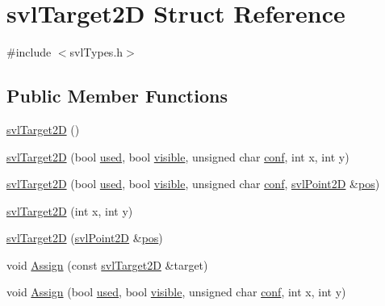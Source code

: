\hypertarget{structsvl_target2_d}{}\section{svl\+Target2\+D Struct Reference}
\label{structsvl_target2_d}


{\ttfamily \#include $<$svl\+Types.\+h$>$}

\subsection*{Public Member Functions}
\begin{DoxyCompactItemize}
\item 
\hyperlink{structsvl_target2_d_ae8f0d611fa66af1f6a157fec39503855}{svl\+Target2\+D} ()
\item 
\hyperlink{structsvl_target2_d_adcf9742ca9daddef7bb7ae43b7adf40c}{svl\+Target2\+D} (bool \hyperlink{structsvl_target2_d_a74896ef54f0cdc80faaee2a7321635bc}{used}, bool \hyperlink{structsvl_target2_d_a90567161b27a6a1c1a8d1bd15c108d63}{visible}, unsigned char \hyperlink{structsvl_target2_d_adae08264a579759ab62b38ba347dc196}{conf}, int x, int y)
\item 
\hyperlink{structsvl_target2_d_adf1a83e89f06d212b325b47b219cae87}{svl\+Target2\+D} (bool \hyperlink{structsvl_target2_d_a74896ef54f0cdc80faaee2a7321635bc}{used}, bool \hyperlink{structsvl_target2_d_a90567161b27a6a1c1a8d1bd15c108d63}{visible}, unsigned char \hyperlink{structsvl_target2_d_adae08264a579759ab62b38ba347dc196}{conf}, \hyperlink{structsvl_point2_d}{svl\+Point2\+D} \&\hyperlink{structsvl_target2_d_ab68be6f073df6ae78c134a2515873b6c}{pos})
\item 
\hyperlink{structsvl_target2_d_acc5a85edb97b779d56f06a282234ccd5}{svl\+Target2\+D} (int x, int y)
\item 
\hyperlink{structsvl_target2_d_ada5bc2911f468ff8848ba42b2594c569}{svl\+Target2\+D} (\hyperlink{structsvl_point2_d}{svl\+Point2\+D} \&\hyperlink{structsvl_target2_d_ab68be6f073df6ae78c134a2515873b6c}{pos})
\item 
void \hyperlink{structsvl_target2_d_a126b7a71755b8cffddb24b7928c040f4}{Assign} (const \hyperlink{structsvl_target2_d}{svl\+Target2\+D} \&target)
\item 
void \hyperlink{structsvl_target2_d_a5eacbff88965651fe6770b0618370fcf}{Assign} (bool \hyperlink{structsvl_target2_d_a74896ef54f0cdc80faaee2a7321635bc}{used}, bool \hyperlink{structsvl_target2_d_a90567161b27a6a1c1a8d1bd15c108d63}{visible}, unsigned char \hyperlink{structsvl_target2_d_adae08264a579759ab62b38ba347dc196}{conf}, int x, int y)

\end{DoxyCompactItemize}
